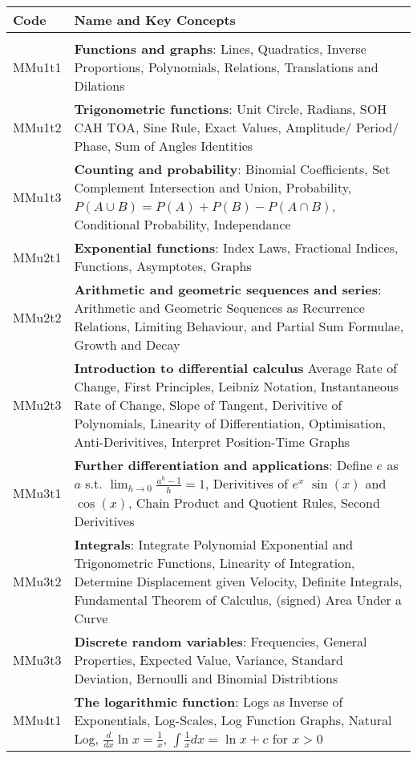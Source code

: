 \documentclass[varwidth=144mm, 12pt]{standalone}
\begin{document}
\begin{longtable}{lp{}}
Code & \textbf{Name} and Key Concepts \\ \hline
& \\ \endhead
MMu1t1 & \textbf{Functions and graphs}: Lines, Quadratics, Inverse Proportions, Polynomials, Relations, Translations and Dilations \\
MMu1t2 & \textbf{Trigonometric functions}: Unit Circle, Radians, SOH CAH TOA, Sine Rule, Exact Values, Amplitude/ Period/ Phase, Sum of Angles Identities \\
MMu1t3 & \textbf{Counting and probability}: Binomial Coefficients, Set Complement Intersection and Union, Probability, $P(A\cup{}B) = P(A) + P(B) - P(A\cap{}B)$, Conditional Probability, Independance \\
MMu2t1 & \textbf{Exponential functions}: Index Laws, Fractional Indices, Functions, Asymptotes, Graphs \\
MMu2t2 & \textbf{Arithmetic and geometric sequences and series}: Arithmetic and Geometric Sequences as Recurrence Relations, Limiting Behaviour, and Partial Sum Formulae, Growth and Decay \\
MMu2t3 & \textbf{Introduction to differential calculus} Average Rate of Change, First Principles, Leibniz Notation, Instantaneous Rate of Change, Slope of Tangent, Derivitive of Polynomials, Linearity of Differentiation, Optimisation, Anti-Derivitives, Interpret Position-Time Graphs \\
MMu3t1 & \textbf{Further differentiation and applications}: Define $e$ as $a$ s.t. $\lim_{h \to 0} \frac{a^h - 1}{h} = 1$, Derivitives of $e^x$ $\sin(x)$ and $\cos(x)$, Chain Product and Quotient Rules, Second Derivitives \\
MMu3t2 & \textbf{Integrals}: Integrate Polynomial Exponential and Trigonometric Functions, Linearity of Integration,  Determine Displacement given Velocity, Definite Integrals, Fundamental Theorem of Calculus, (signed) Area Under a Curve \\
MMu3t3 & \textbf{Discrete random variables}: Frequencies, General Properties, Expected Value, Variance, Standard Deviation, Bernoulli and Binomial Distribtions \\
MMu4t1 & \textbf{The logarithmic function}: Logs as Inverse of Exponentials, Log-Scales, Log Function Graphs, Natural Log, $\frac{d}{dx}\ln{x} = \frac{1}{x}$, $\int \frac{1}{x}dx = \ln{x} + c$ for $x > 0$ \\

\end{longtable}
\end{document}
